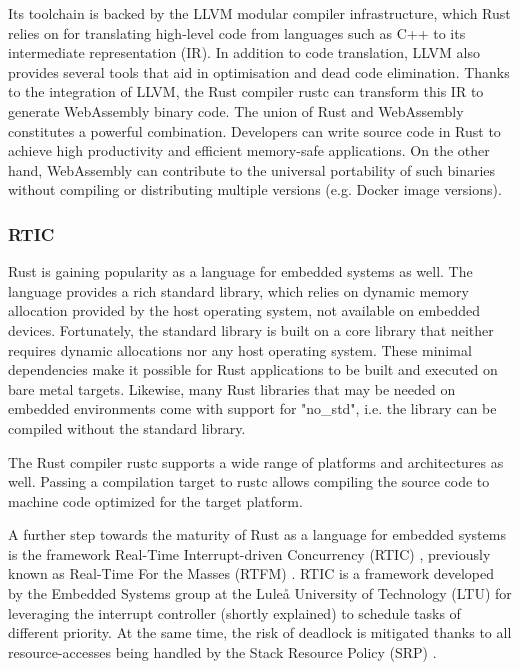 Its toolchain is backed by the LLVM modular compiler infrastructure, which Rust relies on for translating high-level code from languages such as C++ to its intermediate representation (IR). In addition to code translation, LLVM also provides several tools that aid in optimisation and dead code elimination. Thanks to the integration of LLVM, the Rust compiler rustc can transform this IR to generate WebAssembly binary code. The union of Rust and WebAssembly constitutes a powerful combination. Developers can write source code in Rust to achieve high productivity and efficient memory-safe applications. On the other hand, WebAssembly can contribute to the universal portability of such binaries without compiling or distributing multiple versions (e.g. Docker image versions). 

\subsubsection{RTIC}

Rust is gaining popularity as a language for embedded systems as well. The language provides a rich standard library, which relies on dynamic memory allocation provided by the host operating system, not available on embedded devices. Fortunately, the standard library is built on a core library that neither requires dynamic allocations nor any host operating system. These minimal dependencies make it possible for Rust applications to be built and executed on bare metal targets. Likewise, many Rust libraries that may be needed on embedded environments come with support for "no\_std", i.e. the library can be compiled without the standard library. 

The Rust compiler rustc supports a wide range of platforms and architectures as well. Passing a compilation target to rustc allows compiling the source code to machine code optimized for the target platform.

A further step towards the maturity of Rust as a language for embedded systems is the framework Real-Time Interrupt-driven Concurrency (RTIC) \cite{rtic}, previously known as Real-Time For the Masses (RTFM) \cite{rtfm}. RTIC is a framework developed by the Embedded Systems group at the Luleå University of Technology (LTU) for leveraging the interrupt controller (shortly explained) to schedule tasks of different priority. At the same time, the risk of deadlock is mitigated thanks to all resource-accesses being handled by the Stack Resource Policy (SRP) \cite{stack-resource-policy}.

